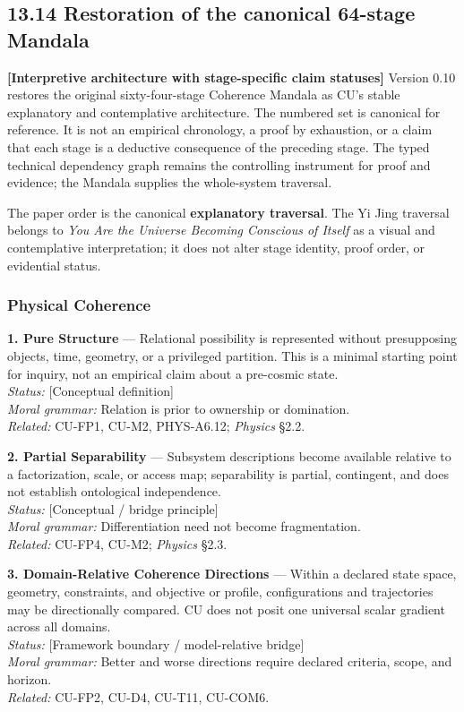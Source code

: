 \documentclass[
  11pt,
]{article}
\begin{document}
\subsection{13.14 Restoration of the canonical 64-stage
Mandala}\label{restoration-of-the-canonical-64-stage-mandala}

\textbf{{[}Interpretive architecture with stage-specific claim
statuses{]}} Version 0.10 restores the original sixty-four-stage
Coherence Mandala as CU's stable explanatory and contemplative
architecture. The numbered set is canonical for reference. It is not an
empirical chronology, a proof by exhaustion, or a claim that each stage
is a deductive consequence of the preceding stage. The typed technical
dependency graph remains the controlling instrument for proof and
evidence; the Mandala supplies the whole-system traversal.

The paper order is the canonical \textbf{explanatory traversal}. The Yi
Jing traversal belongs to \emph{You Are the Universe Becoming Conscious
of Itself} as a visual and contemplative interpretation; it does not
alter stage identity, proof order, or evidential status.

\subsubsection{Physical Coherence}\label{physical-coherence}

\textbf{1. Pure Structure} --- Relational possibility is represented
without presupposing objects, time, geometry, or a privileged partition.
This is a minimal starting point for inquiry, not an empirical claim
about a pre-cosmic state.\\
\emph{Status:} {[}Conceptual definition{]}\\
\emph{Moral grammar:} Relation is prior to ownership or domination.\\
\emph{Related:} CU-FP1, CU-M2, PHYS-A6.12; \emph{Physics} §2.2.

\textbf{2. Partial Separability} --- Subsystem descriptions become
available relative to a factorization, scale, or access map;
separability is partial, contingent, and does not establish ontological
independence.\\
\emph{Status:} {[}Conceptual / bridge principle{]}\\
\emph{Moral grammar:} Differentiation need not become fragmentation.\\
\emph{Related:} CU-FP4, CU-M2; \emph{Physics} §2.3.

\textbf{3. Domain-Relative Coherence Directions} --- Within a declared
state space, geometry, constraints, and objective or profile,
configurations and trajectories may be directionally compared. CU does
not posit one universal scalar gradient across all domains.\\
\emph{Status:} {[}Framework boundary / model-relative bridge{]}\\
\emph{Moral grammar:} Better and worse directions require declared
criteria, scope, and horizon.\\
\emph{Related:} CU-FP2, CU-D4, CU-T11, CU-COM6.
\end{document}
